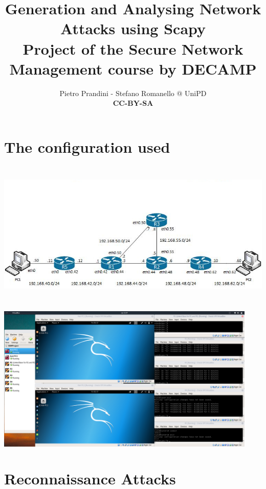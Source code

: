 \documentclass[10pt,a4paper]{article}
\author{Pietro Prandini - Stefano Romanello @ UniPD\\{\textbf{\tiny{CC-BY-SA}}}}
\title{Generation and Analysing Network Attacks using Scapy\\{\small{Project of the Secure Network Management course by DECAMP}}}
\begin{document}
\maketitle %
\tableofcontents %
\clearpage

\section{The configuration used}
\begin{center}
\includegraphics[height=7cm]{img/NetworkConfiguration.jpg}\par
\includegraphics[height=7cm]{img/GlobalConfiguration.png}\par
\end{center}


\clearpage

\section{Reconnaissance Attacks}
%

\clearpage
\end{document}
